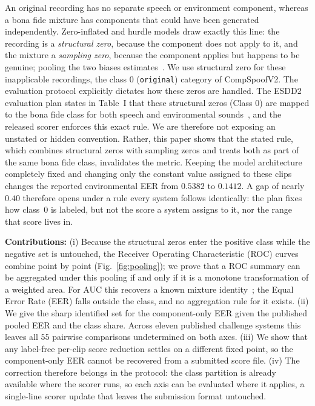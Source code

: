 \documentclass{article}
\begin{document}
An original recording has no separate speech or environment component, whereas a bona fide mixture has components that could have been generated independently. Zero-inflated and hurdle models draw exactly this line: the recording is a \emph{structural zero}, because the component does not apply to it, and the mixture a \emph{sampling zero}, because the component applies but happens to be genuine; pooling the two biases estimates~\cite{he2014}. We use structural zero for these inapplicable recordings, the class 0 (\texttt{original}) category of CompSpoofV2.
The evaluation protocol explicitly dictates how these zeros are handled. The ESDD2 evaluation plan states in Table~I that these structural zeros (Class 0) are mapped to the bona fide class for both speech and environmental sounds~\cite{esdd2plan}, and the released scorer enforces this exact rule. We are therefore not exposing an unstated or hidden convention. Rather, this paper shows that the stated rule, which combines structural zeros with sampling zeros and treats both as part of the same bona fide class, invalidates the metric. Keeping the model architecture completely fixed and changing only the constant value assigned to these clips changes the reported environmental EER from $0.5382$ to $0.1412$. A gap of nearly $0.40$ therefore opens under a rule every system follows identically: the plan fixes how class~0 is labeled, but not the score a system assigns to it, nor the range that score lives in.

\vspace{2pt}\noindent \textbf{Contributions: } (i) Because the structural zeros enter the positive class while the negative set is untouched, the Receiver Operating Characteristic (ROC) curves combine point by point (Fig.~\ref{fig:pooling}); we prove that a ROC summary can be aggregated under this pooling if and only if it is a monotone transformation of a weighted area. For AUC this recovers a known mixture identity~\cite{gonen2013}; the Equal Error Rate (EER) falls outside the class, and no aggregation rule for it exists. (ii) We give the sharp identified set for the component-only EER given the published pooled EER and the class share. Across eleven published challenge systems this leaves all $55$ pairwise comparisons undetermined on both axes. (iii) We show that any label-free per-clip score reduction settles on a different fixed point, so the component-only EER cannot be recovered from a submitted score file. (iv) The correction therefore belongs in the protocol: the class partition is already available where the scorer runs, so each axis can be evaluated where it applies, a single-line scorer update that leaves the submission format untouched.
\end{document}
